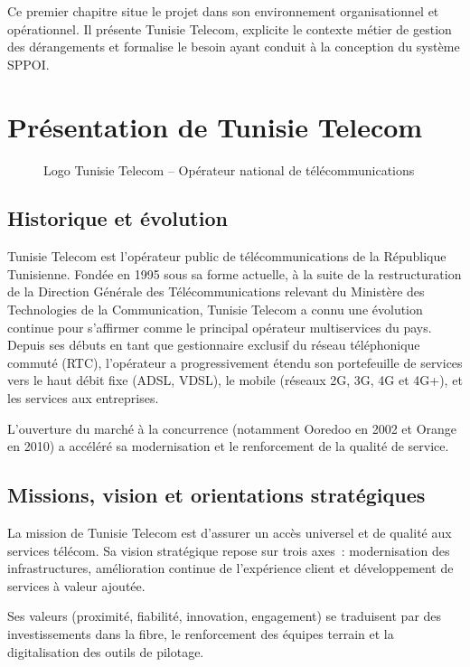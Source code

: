 \documentclass[10pt,a4paper]{report}
\newcommand{\chapintro}[1]{%
  \begin{tcolorbox}[introbox]
    #1
  \end{tcolorbox}%
  \vspace{8pt}%
}
\begin{document}
\chapintro{%
Ce premier chapitre situe le projet dans son environnement organisationnel et opérationnel. Il présente Tunisie Telecom, explicite le contexte métier de gestion des dérangements et formalise le besoin ayant conduit à la conception du système SPPOI.%
}


\section{Présentation de Tunisie Telecom}

\begin{figure}[H]
\centering
\caption{Logo Tunisie Telecom -- Opérateur national de télécommunications}
\label{fig:logo-tt}
\end{figure}

\subsection{Historique et évolution}

Tunisie Telecom est l'opérateur public de télécommunications de la République Tunisienne. Fondée en 1995 sous sa forme actuelle, à la suite de la restructuration de la Direction Générale des Télécommunications relevant du Ministère des Technologies de la Communication, Tunisie Telecom a connu une évolution continue pour s'affirmer comme le principal opérateur multiservices du pays. Depuis ses débuts en tant que gestionnaire exclusif du réseau téléphonique commuté (RTC), l'opérateur a progressivement étendu son portefeuille de services vers le haut débit fixe (ADSL, VDSL), le mobile (réseaux 2G, 3G, 4G et 4G+), et les services aux entreprises.

L'ouverture du marché à la concurrence (notamment Ooredoo en 2002 et Orange en 2010) a accéléré sa modernisation et le renforcement de la qualité de service.

\subsection{Missions, vision et orientations stratégiques}

La mission de Tunisie Telecom est d'assurer un accès universel et de qualité aux services télécom. Sa vision stratégique repose sur trois axes~: modernisation des infrastructures, amélioration continue de l'expérience client et développement de services à valeur ajoutée.

Ses valeurs (proximité, fiabilité, innovation, engagement) se traduisent par des investissements dans la fibre, le renforcement des équipes terrain et la digitalisation des outils de pilotage.
\end{document}
